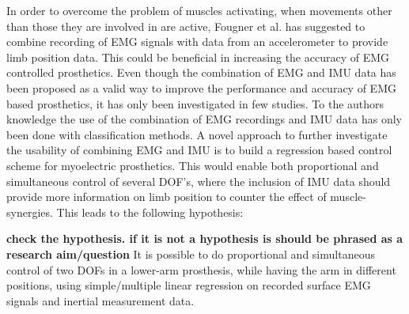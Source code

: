 In order to overcome the problem of muscles activating, when movements other than those they are involved in are active, Fougner et al. \cite{Fougner2011} has suggested to combine recording of EMG signals with data from an accelerometer to provide limb position data. This could be beneficial in increasing the accuracy of EMG controlled prosthetics. 
Even though the combination of EMG and IMU data has been proposed as a valid way to improve the performance and accuracy of EMG based prosthetics, it has only been investigated in few studies. \cite{Roy2010, Imtiaz2014, jiang2012}
To the authors knowledge the use of the combination of EMG recordings and IMU data has only been done with classification methods. A novel approach to further investigate the usability of combining EMG and IMU is to build a regression based control scheme for myoelectric prosthetics. This would enable both proportional and simultaneous control of several DOF's, where the inclusion of IMU data should provide more information on limb position to counter the effect of muscle-synergies. 
This leads to the following hypothesis:
\begin{center}
	\textbf{check the hypothesis. if it is not a hypothesis is should be phrased as a research aim/question} It is possible to do proportional and simultaneous control of two DOFs in a lower-arm prosthesis, while having the arm in different positions, using simple/multiple linear regression on recorded surface EMG signals and inertial measurement data.
\end{center}








